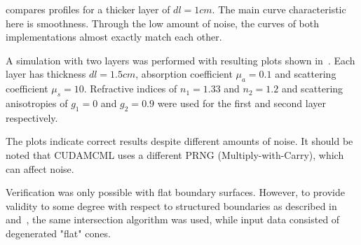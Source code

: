 \documentclass[]{article}
\begin{document}
 compares profiles for a thicker layer of $dl=1cm$. The main curve characteristic here is smoothness. Through the low amount of noise, the curves of both implementations almost exactly match each other.

A simulation with two layers was performed with resulting plots shown in~. Each layer has thickness $dl=1.5cm$, absorption coefficient $\mu_a=0.1$ and scattering coefficient $\mu_s=10$. Refractive indices of $n_1=1.33$ and $n_2=1.2$ and scattering anisotropies of $g_1=0$ and $g_2=0.9$ were used for the first and second layer respectively.

The plots indicate correct results despite different amounts of noise. It should be noted that CUDAMCML uses a different PRNG (Multiply-with-Carry), which can affect noise.

Verification was only possible with flat boundary surfaces. However, to provide validity to some degree with respect to structured boundaries as described in~ and~, the same intersection algorithm was used, while input data consisted of degenerated "flat" cones.
\end{document}
